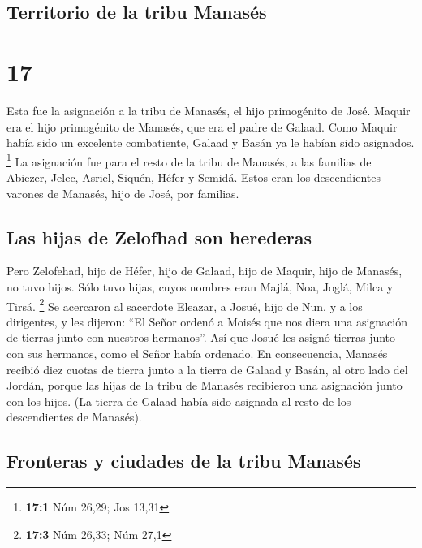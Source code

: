 \hypertarget{territorio-de-la-tribu-manasuxe9s}{%
\subsection{Territorio de la tribu
Manasés}\label{territorio-de-la-tribu-manasuxe9s}}

\hypertarget{section-16}{%
\section{17}\label{section-16}}

 Esta fue la asignación a la tribu de Manasés, el hijo
primogénito de José. Maquir era el hijo primogénito de Manasés, que era
el padre de Galaad. Como Maquir había sido un excelente combatiente,
Galaad y Basán ya le habían sido asignados. \footnote{\textbf{17:1} Núm
  26,29; Jos 13,31}  La asignación fue para el resto de la
tribu de Manasés, a las familias de Abiezer, Jelec, Asriel, Siquén,
Héfer y Semidá. Estos eran los descendientes varones de Manasés, hijo de
José, por familias.

\hypertarget{las-hijas-de-zelofhad-son-herederas}{%
\subsection{Las hijas de Zelofhad son
herederas}\label{las-hijas-de-zelofhad-son-herederas}}

 Pero Zelofehad, hijo de Héfer, hijo de Galaad, hijo de
Maquir, hijo de Manasés, no tuvo hijos. Sólo tuvo hijas, cuyos nombres
eran Majlá, Noa, Joglá, Milca y Tirsá. \footnote{\textbf{17:3} Núm
  26,33; Núm 27,1}  Se acercaron al sacerdote Eleazar, a
Josué, hijo de Nun, y a los dirigentes, y les dijeron: ``El Señor ordenó
a Moisés que nos diera una asignación de tierras junto con nuestros
hermanos''. Así que Josué les asignó tierras junto con sus hermanos,
como el Señor había ordenado.  En consecuencia, Manasés
recibió diez cuotas de tierra junto a la tierra de Galaad y Basán, al
otro lado del Jordán,  porque las hijas de la tribu de
Manasés recibieron una asignación junto con los hijos. (La tierra de
Galaad había sido asignada al resto de los descendientes de Manasés).

\hypertarget{fronteras-y-ciudades-de-la-tribu-manasuxe9s}{%
\subsection{Fronteras y ciudades de la tribu
Manasés}\label{fronteras-y-ciudades-de-la-tribu-manasuxe9s}}


